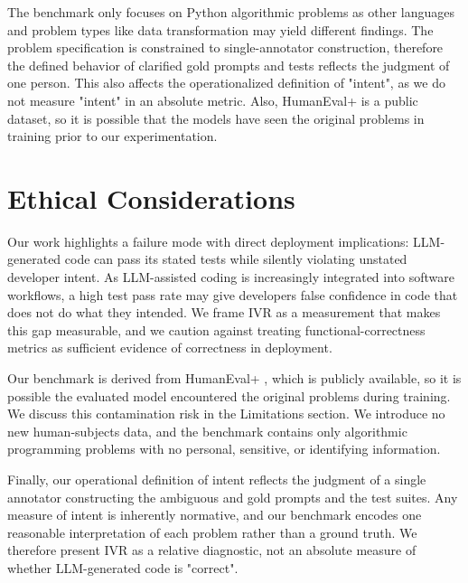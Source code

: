 \documentclass[11pt]{article}
\begin{document}
The benchmark only focuses on Python algorithmic problems as other languages and problem types like data transformation may yield different findings. The problem specification is constrained to single-annotator construction, therefore the defined behavior of clarified gold prompts and tests reflects the judgment of one person. This also affects the operationalized definition of "intent", as we do not measure "intent" in an absolute metric. Also, HumanEval+ is a public dataset, so it is possible that the models have seen the original problems in training prior to our experimentation. 

\section*{Ethical Considerations}
Our work highlights a failure mode with direct deployment implications: LLM-generated code can pass its stated tests while silently violating unstated developer intent. As LLM-assisted coding is increasingly integrated into software workflows, a high test pass rate may give developers false confidence in code that does not do what they intended. We frame IVR as a measurement that  makes this gap measurable, and we caution against treating functional-correctness metrics as sufficient evidence of correctness in deployment. 

Our benchmark is derived from HumanEval+ \citep{liu2023evalplus}, which is publicly available, so it is possible the evaluated model encountered the original problems during training. We discuss this contamination risk in the Limitations section. We introduce no new human-subjects data, and the benchmark contains only algorithmic programming problems with no personal, sensitive, or identifying information. 

Finally, our operational definition of intent reflects the judgment of a single annotator constructing the ambiguous and gold prompts and the test suites. Any measure of intent is inherently normative, and our benchmark encodes one reasonable interpretation of each problem rather than a ground truth. We therefore present IVR as a relative diagnostic, not an absolute measure of whether LLM-generated code is "correct". 


\end{document}
